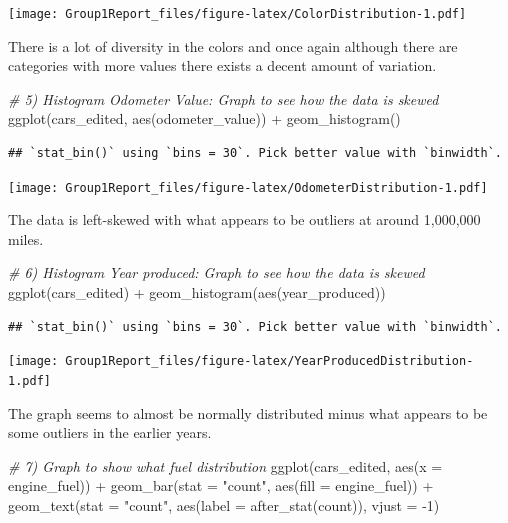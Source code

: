 \documentclass[
]{article}
\newenvironment{Shaded}{\begin{snugshade}}{\end{snugshade}}
\newcommand{\AttributeTok}[1]{\textcolor[rgb]{0.77,0.63,0.00}{#1}}
\newcommand{\CommentTok}[1]{\textcolor[rgb]{0.56,0.35,0.01}{\textit{#1}}}
\newcommand{\DecValTok}[1]{\textcolor[rgb]{0.00,0.00,0.81}{#1}}
\newcommand{\FunctionTok}[1]{\textcolor[rgb]{0.00,0.00,0.00}{#1}}
\newcommand{\NormalTok}[1]{#1}
\newcommand{\SpecialCharTok}[1]{\textcolor[rgb]{0.00,0.00,0.00}{#1}}
\newcommand{\StringTok}[1]{\textcolor[rgb]{0.31,0.60,0.02}{#1}}
\begin{document}
\texttt{[image: Group1Report\_files/figure-latex/ColorDistribution-1.pdf]}

There is a lot of diversity in the colors and once again although there
are categories with more values there exists a decent amount of
variation.

\begin{Shaded}
\begin{Highlighting}[]
\CommentTok{\# 5) Histogram Odometer Value: Graph to see how the data is skewed}
\FunctionTok{ggplot}\NormalTok{(cars\_edited, }\FunctionTok{aes}\NormalTok{(odometer\_value)) }\SpecialCharTok{+} \FunctionTok{geom\_histogram}\NormalTok{()}
\end{Highlighting}
\end{Shaded}

\begin{verbatim}
## `stat_bin()` using `bins = 30`. Pick better value with `binwidth`.
\end{verbatim}

\texttt{[image: Group1Report\_files/figure-latex/OdometerDistribution-1.pdf]}

The data is left-skewed with what appears to be outliers at around
1,000,000 miles.

\begin{Shaded}
\begin{Highlighting}[]
\CommentTok{\# 6) Histogram Year produced: Graph to see how the data is skewed}
\FunctionTok{ggplot}\NormalTok{(cars\_edited) }\SpecialCharTok{+} \FunctionTok{geom\_histogram}\NormalTok{(}\FunctionTok{aes}\NormalTok{(year\_produced))}
\end{Highlighting}
\end{Shaded}

\begin{verbatim}
## `stat_bin()` using `bins = 30`. Pick better value with `binwidth`.
\end{verbatim}

\texttt{[image: Group1Report\_files/figure-latex/YearProducedDistribution-1.pdf]}

The graph seems to almost be normally distributed minus what appears to
be some outliers in the earlier years.

\begin{Shaded}
\begin{Highlighting}[]
\CommentTok{\# 7) Graph to show what fuel distribution}
\FunctionTok{ggplot}\NormalTok{(cars\_edited, }\FunctionTok{aes}\NormalTok{(}\AttributeTok{x =}\NormalTok{ engine\_fuel)) }\SpecialCharTok{+} \FunctionTok{geom\_bar}\NormalTok{(}\AttributeTok{stat =} \StringTok{"count"}\NormalTok{, }\FunctionTok{aes}\NormalTok{(}\AttributeTok{fill =}\NormalTok{ engine\_fuel)) }\SpecialCharTok{+} \FunctionTok{geom\_text}\NormalTok{(}\AttributeTok{stat =} \StringTok{"count"}\NormalTok{, }\FunctionTok{aes}\NormalTok{(}\AttributeTok{label =} \FunctionTok{after\_stat}\NormalTok{(count)), }\AttributeTok{vjust =} \SpecialCharTok{{-}}\DecValTok{1}\NormalTok{)}
\end{Highlighting}
\end{Shaded}
\end{document}
